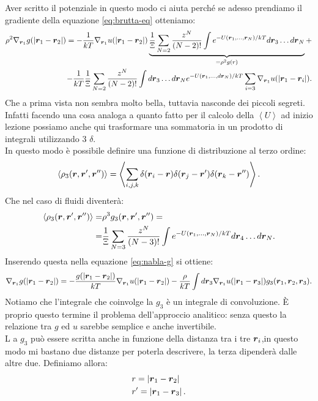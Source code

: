 Aver scritto il potenziale in questo modo ci aiuta perché se adesso prendiamo il gradiente della equazione \ref{eq:brutta-eq} otteniamo:
\[\begin{aligned}
	\rho ^2\nabla_{\boldsymbol{r}_1}g(\left| \boldsymbol{r}_1-\boldsymbol{r}_2 \right| ) =
	- \frac{1}{kT} \nabla_{\boldsymbol{r}_1}u(\left| \boldsymbol{r}_1-\boldsymbol{r}_2 \right|)
	\underbrace{
	\frac{1}{\Upxi}\sum_{N=2}^{} \frac{z^N}{(N-2)!}
	\int e^{- U(\boldsymbol{r}_1,\ldots,\boldsymbol{r}_N)/kT}d \boldsymbol{r}_3\ldots d \boldsymbol{r}_N 
	}_{=\rho ^2 g(r)}
	+ \\
	- \frac{1}{kT} \frac{1}{\Upxi} \sum_{N=2}^{} \frac{z^N}{(N-2)!}
	\int d\boldsymbol{r}_3 \ldots d \boldsymbol{r}_N e^{-U(\boldsymbol{r}_1,\ldots,d \boldsymbol{r}_N)/kT}
	\sum_{i=3}^{} \nabla_{\boldsymbol{r}_1}u(\left| \boldsymbol{r}_1 - \boldsymbol{r}_i \right| )
	\label{eq:nabla-g}
.\end{aligned}\]
Che a prima vista non sembra molto bella, tuttavia nasconde dei piccoli segreti. Infatti facendo una cosa analoga a quanto fatto per il calcolo della $\left<U \right>$ ad inizio lezione possiamo anche qui trasformare una sommatoria in un prodotto di integrali utilizzando 3 $\delta$. \\
In questo modo è possibile definire una funzione di distribuzione al terzo ordine:
\[
	\left<\rho _3(\boldsymbol{r},\boldsymbol{r}',\boldsymbol{r}'') \right> 
	=
	\left< 
	\sum_{i,j,k}^{} 
	\delta(\boldsymbol{r}_i-\boldsymbol{r})\delta(\boldsymbol{r}_j-\boldsymbol{r}')\delta(\boldsymbol{r}_k-\boldsymbol{r}'')
	\right>
.\] 
Che nel caso di fluidi diventerà:
\[\begin{aligned}
	\left<\rho _3(\boldsymbol{r},\boldsymbol{r}',\boldsymbol{r}'') \right> 
	=&
	\rho ^3 g_3(\boldsymbol{r},\boldsymbol{r}',\boldsymbol{r}'') =\\
	=&
	\frac{1}{\Upxi}\sum_{N=3}^{} 
	\frac{z^N}{(N-3)!}\int e^{-U(\boldsymbol{r}_1,\ldots,\boldsymbol{r}_N)/kT} d \boldsymbol{r}_4\ldots d \boldsymbol{r}_N
.\end{aligned}\]
Inserendo questa nella equazione \ref{eq:nabla-g} si ottiene:
\[
	\nabla_{\boldsymbol{r}_1} g(\left| \boldsymbol{r}_1-\boldsymbol{r}_2 \right| ) 
	=
	- \frac{g(\left| \boldsymbol{r}_1 -\boldsymbol{r}_2\right| )}{kT}  
	\nabla_{\boldsymbol{r}_1}u(\left| \boldsymbol{r}_1-\boldsymbol{r}_2 \right|) 
	-
	\frac{\rho }{kT} \int d \boldsymbol{r}_3\nabla_{\boldsymbol{r}_1}u(\left| \boldsymbol{r}_1-\boldsymbol{r}_3 \right|)
	g_3(\boldsymbol{r}_1,\boldsymbol{r}_2,\boldsymbol{r}_3)
	\label{eq:non-approx-g}
.\] 
Notiamo che l'integrale che coinvolge la $g_3$ è un integrale di convoluzione. È proprio questo termine il problema dell'approccio analitico: senza questo la relazione tra $g$ ed $u$ sarebbe semplice e anche invertibile.\\
L a $g_3$ può essere scritta anche in funzione della distanza tra i tre  $\boldsymbol{r}_i$,in questo modo mi bastano due distanze per poterla descrivere, la terza dipenderà dalle altre due. Definiamo allora:
\[\begin{aligned}
	& r = \left| \boldsymbol{r}_1-\boldsymbol{r}_2 \right| \\
	&r' = \left| \boldsymbol{r}_1-\boldsymbol{r}_3 \right| 
.\end{aligned}\]
